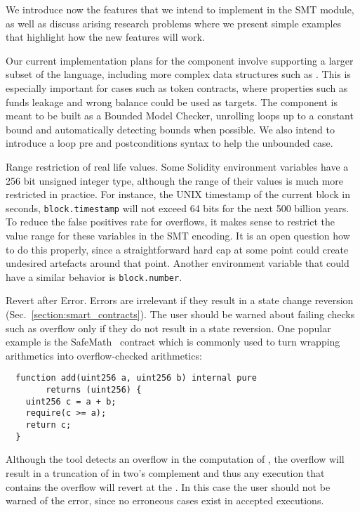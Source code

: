 We introduce now the features that we intend to implement in the SMT module, as
well as discuss arising research problems where we present simple examples that
highlight how the new features will work.

Our current implementation plans for the component involve supporting
a larger subset of the language, including more complex data structures
such as .
%
This is especially important for cases such as token contracts, where
properties such as funds leakage and wrong balance could be used as targets.
%
The component is meant to be built as a Bounded Model Checker, unrolling loops
up to a constant bound and automatically detecting bounds when possible.
%
We also intend to introduce a loop pre and postconditions syntax to help the
unbounded case.

\begin{paragraph}{Range restriction of real life values.}
Some Solidity environment variables have a 256 bit unsigned integer type,
although the range of their values is much more restricted in practice.
For instance, the UNIX timestamp of the current block in seconds,
\texttt{block.timestamp} will not exceed 64 bits for the next
500 billion years. To reduce the false positives rate for
overflows, it makes sense to restrict the value range for these
variables in the SMT encoding. It is an open question how to do
this properly, since a straightforward hard cap at some point
could create undesired artefacts around that point.
%
Another environment variable that could have a similar
behavior is \texttt{block.number}.
\end{paragraph}

\begin{paragraph}{Revert after Error.}
Errors are irrelevant if they result in a state change reversion
(Sec.~\ref{section:smart_contracts}). The user should be warned
about failing checks such as overflow only if they do not result in a state reversion.
%
One popular example is the SafeMath~\cite{SafeMath} contract which
is commonly used to turn wrapping arithmetics into overflow-checked arithmetics:

\begin{verbatim}
  function add(uint256 a, uint256 b) internal pure
        returns (uint256) {
    uint256 c = a + b;
    require(c >= a);
    return c;
  }
\end{verbatim}

Although the tool detects an overflow in the computation of ,
the overflow will result in a truncation of  in two's complement and thus
any execution that contains the overflow will revert at the .
%
In this case the user should not be warned of the error, since no erroneous cases
exist in accepted executions.
\end{paragraph}

